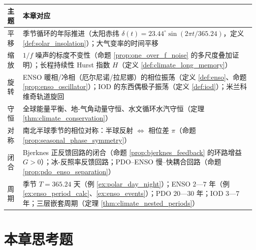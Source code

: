 \begin{center}
\begin{tabular}{>{\centering\arraybackslash}p{2.2cm}>{\centering\arraybackslash}p{10.5cm}}
\toprule
主题 & 本章对应 \\
\midrule
平移 & 季节循环的年际推进（太阳赤纬 $\delta(t) = 23.44^\circ \sin(2\pi t/365.24)$，定义 \ref{def:solar_insolation}）；大气变率的时间平移 \\
缩放 & $1/f$ 噪声的标度不变性（命题 \ref{prop:one_over_f_noise} 的多尺度叠加证明）；长程持续性 Hurst 指数 $H$（定义 \ref{def:climate_long_memory}） \\
旋转 & ENSO 暖相/冷相（厄尔尼诺/拉尼娜）的相位振荡（定义 \ref{def:enso}、命题 \ref{prop:enso_oscillator}）；IOD 的东西偶极子振荡（定义 \ref{def:iod}）；米兰科维奇轨道旋回 \\
守恒 & 全球能量平衡、地-气角动量守恒、水文循环水汽守恒（定理 \ref{thm:climate_conservation}） \\
对称 & 南北半球季节的相位对称：半球反射 $\Leftrightarrow$ 相位差 $\pi$（命题 \ref{prop:seasonal_phase_symmetry}） \\
闭合 & Bjerknes 正反馈回路的闭合（命题 \ref{prop:bjerknes_feedback} 的环路增益 $G>0$）；冰-反照率反馈回路；PDO–ENSO 慢–快耦合回路（命题 \ref{prop:pdo_enso_separation}） \\
周期 & 季节 $T=365.24$ 天（例 \ref{ex:polar_day_night}）；ENSO $2$—$7$ 年（例 \ref{ex:enso_period_calc}、\ref{ex:enso_events}）；PDO $20$—$30$ 年；IOD $3$—$7$ 年；三层嵌套周期（定理 \ref{thm:climate_nested_periods}） \\
\bottomrule
\end{tabular}
\end{center}

\section*{本章思考题}

